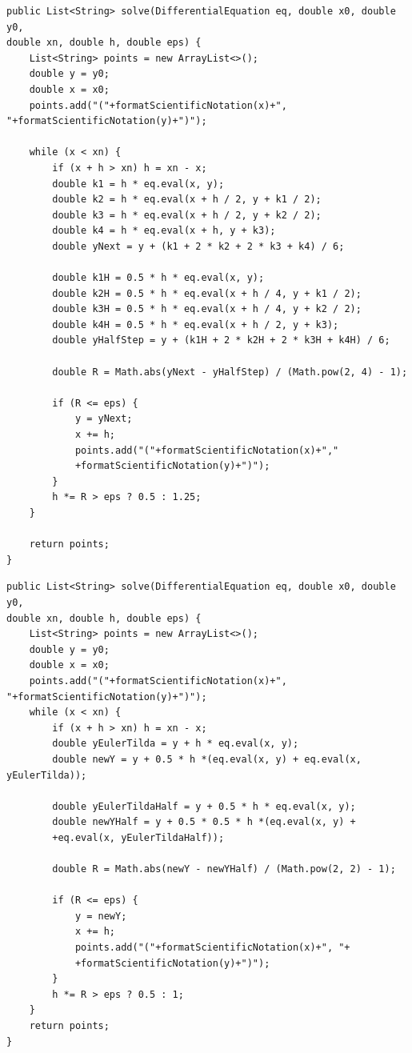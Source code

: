 \documentclass{article}
\begin{document}
\begin{lstlisting}[caption={Реализация метода Рунге-Кутты 2 порядка.}]
public List<String> solve(DifferentialEquation eq, double x0, double y0, 
double xn, double h, double eps) {
    List<String> points = new ArrayList<>();
    double y = y0;
    double x = x0;
    points.add("("+formatScientificNotation(x)+", "+formatScientificNotation(y)+")");

    while (x < xn) {
        if (x + h > xn) h = xn - x;  
        double k1 = h * eq.eval(x, y);
        double k2 = h * eq.eval(x + h / 2, y + k1 / 2);
        double k3 = h * eq.eval(x + h / 2, y + k2 / 2);
        double k4 = h * eq.eval(x + h, y + k3);
        double yNext = y + (k1 + 2 * k2 + 2 * k3 + k4) / 6;

        double k1H = 0.5 * h * eq.eval(x, y);
        double k2H = 0.5 * h * eq.eval(x + h / 4, y + k1 / 2);
        double k3H = 0.5 * h * eq.eval(x + h / 4, y + k2 / 2);
        double k4H = 0.5 * h * eq.eval(x + h / 2, y + k3);
        double yHalfStep = y + (k1H + 2 * k2H + 2 * k3H + k4H) / 6;

        double R = Math.abs(yNext - yHalfStep) / (Math.pow(2, 4) - 1); 

        if (R <= eps) {
            y = yNext;
            x += h;
            points.add("("+formatScientificNotation(x)+","
            +formatScientificNotation(y)+")");
        }
        h *= R > eps ? 0.5 : 1.25; 
    }

    return points;
}
\end{lstlisting}

\begin{lstlisting}[caption={Реализация модифицированного метода Эйлера}]
public List<String> solve(DifferentialEquation eq, double x0, double y0, 
double xn, double h, double eps) {
    List<String> points = new ArrayList<>();
    double y = y0;
    double x = x0;
    points.add("("+formatScientificNotation(x)+", "+formatScientificNotation(y)+")");
    while (x < xn) {
        if (x + h > xn) h = xn - x;
        double yEulerTilda = y + h * eq.eval(x, y);
        double newY = y + 0.5 * h *(eq.eval(x, y) + eq.eval(x, yEulerTilda));

        double yEulerTildaHalf = y + 0.5 * h * eq.eval(x, y);
        double newYHalf = y + 0.5 * 0.5 * h *(eq.eval(x, y) + 
        +eq.eval(x, yEulerTildaHalf));

        double R = Math.abs(newY - newYHalf) / (Math.pow(2, 2) - 1);

        if (R <= eps) {
            y = newY;
            x += h;
            points.add("("+formatScientificNotation(x)+", "+
            +formatScientificNotation(y)+")");
        }
        h *= R > eps ? 0.5 : 1;
    }
    return points;
}
\end{lstlisting}
\end{document}
